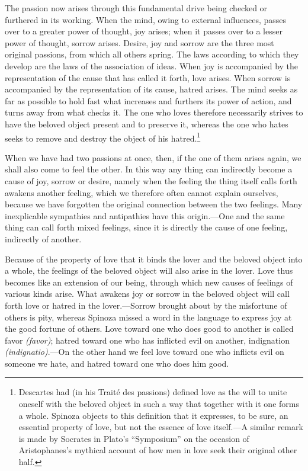 \documentclass[12pt]{book}
\newcommand{\opage}[1]{\marginnote{\footnotesize\textit{[#1]}}}
\begin{document}
The passion now arises through this fundamental drive being checked or furthered in its
working. When the mind, owing to external influences, passes over to a greater power of
thought, joy arises; when it passes over to a lesser power of thought, sorrow arises.
Desire, joy and sorrow are the three most original passions, from which all others
spring. The laws according to which they develop are the laws of the association of
ideas. When joy is accompanied by the representation of the cause that has called it
forth, love arises. When sorrow is accompanied by the representation of its cause,
hatred arises. The mind seeks as far as possible to hold fast what increases and
furthers its power of action, and turns away from what checks it. The one who loves
therefore necessarily strives to have the beloved object present and to preserve it,
whereas the one who hates seeks to remove and destroy the object of his
hatred.\footnote{Descartes had (in his Traité des passions) defined love as the will to
unite oneself with the beloved object in such a way that together with it one forms a
whole. Spinoza objects to this definition that it expresses, to be sure, an essential
property of love, but not the essence of love itself.---A similar remark is made by
Socrates in Plato's ``Symposium'' on the occasion of Aristophanes's mythical account of
how men in love seek their original other half.}

\opage{127}When we have had two passions at once, then, if the one of them arises again,
we shall also come to feel the other. In this way any thing can indirectly become a cause
of joy, sorrow or desire, namely when the feeling the thing itself calls forth awakens
another feeling, which we therefore often cannot explain ourselves, because we have
forgotten the original connection between the two feelings. Many inexplicable
sympathies and antipathies have this origin.---One and the same thing can call forth
mixed feelings, since it is directly the cause of one feeling, indirectly of another.

Because of the property of love that it binds the lover and the beloved object into a
whole, the feelings of the beloved object will also arise in the lover. Love thus
becomes like an extension of our being, through which new causes of feelings of various
kinds arise. What awakens joy or sorrow in the beloved object will call forth love or
hatred in the lover.---Sorrow brought about by the misfortune of others is pity, whereas
Spinoza missed a word in the language to express joy at the good fortune of others.
Love toward one who does good to another is called favor \textit{(favor)}; hatred toward
one who has inflicted evil on another, indignation \textit{(indignatio)}.---On the other
hand we feel love toward one who inflicts evil on someone we hate, and hatred toward one
who does him good.
\end{document}
